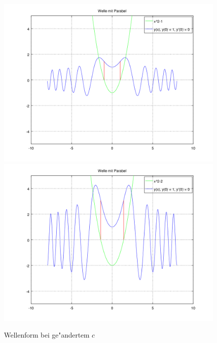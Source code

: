 \begin{figure}
	\includegraphics[scale=0.35]{./wellen/images/varc/cneg1.png}
	\includegraphics[scale=0.35]{./wellen/images/varc/cneg2.png}
	\caption{Wellenform bei ge"andertem $c$}
	\label{fig:wellen:variablec}
\end{figure}

